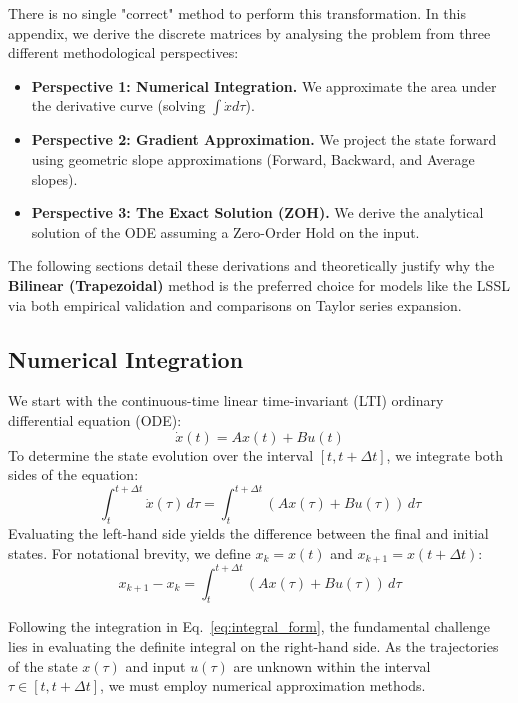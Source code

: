 \documentclass[a4paper,11pt]{article}
\begin{document}
There is no single "correct" method to perform this transformation. In this appendix, we derive the discrete matrices by analysing the problem from three different methodological perspectives:

\begin{itemize}
    \item \textbf{Perspective 1: Numerical Integration.} We approximate the area under the derivative curve (solving $\int \dot{x} d\tau$).
    \item \textbf{Perspective 2: Gradient Approximation.} We project the state forward using geometric slope approximations (Forward, Backward, and Average slopes).
    \item \textbf{Perspective 3: The Exact Solution (ZOH).} We derive the analytical solution of the ODE assuming a Zero-Order Hold on the input.
\end{itemize}

The following sections detail these derivations and theoretically justify why the \textbf{Bilinear (Trapezoidal)} method is the preferred choice for models like the LSSL via both empirical validation and comparisons on Taylor series expansion.

\subsection{Numerical Integration}
We start with the continuous-time linear time-invariant (LTI) ordinary differential equation (ODE):
\begin{equation}\label{eq:ode_base}
    \dot{x}(t) = A x(t) + B u(t)
\end{equation}
To determine the state evolution over the interval $[t, t + \Delta t]$, we integrate both sides of the equation:
\begin{equation}\label{eq:itegral_both_sides}
    \int_{t}^{t+\Delta t} \dot{x}(\tau) \, d\tau = \int_{t}^{t+\Delta t} (A x(\tau) + B u(\tau)) \, d\tau
\end{equation}
Evaluating the left-hand side yields the difference between the final and initial states. For notational brevity, we define $x_k = x(t)$ and $x_{k+1} = x(t+\Delta t)$:
\begin{equation}\label{eq:integral_form}
    x_{k+1} - x_k = \int_{t}^{t+\Delta t} (A x(\tau) + B u(\tau)) \, d\tau
\end{equation}


Following the integration in Eq.~\eqref{eq:integral_form}, the fundamental challenge lies in evaluating the definite integral on the right-hand side. As the trajectories of the state $x(\tau)$ and input $u(\tau)$ are unknown within the interval $\tau \in [t, t+\Delta t]$, we must employ numerical approximation methods. 
\end{document}
